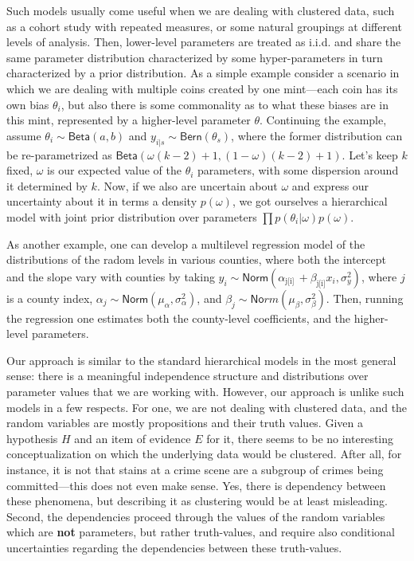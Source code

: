 \documentclass[
  10pt,
  dvipsnames,enabledeprecatedfontcommands]{scrartcl}
\begin{document}
Such models usually come useful when we are dealing with clustered data,
such as a cohort study with repeated measures, or some natural groupings
at different levels of analysis. Then, lower-level parameters are
treated as i.i.d. and share the same parameter distribution
characterized by some hyper-parameters in turn characterized by a prior
distribution. As a simple example consider a scenario in which we are
dealing with multiple coins created by one mint---each coin has its own
bias \(\theta_i\), but also there is some commonality as to what these
biases are in this mint, represented by a higher-level parameter
\(\theta\). Continuing the example, assume
\(\theta_i \sim \mathsf{Beta}(a, b)\) and
\(y_{i\vert s} \sim \mathsf{Bern}(\theta_s)\), where the former
distribution can be re-parametrized as
\(\mathsf{Beta}(\omega(k-2)+1, (1-\omega)(k-2)+1)\). Let's keep \(k\)
fixed, \(\omega\) is our expected value of the \(\theta_i\) parameters,
with some dispersion around it determined by \(k\). Now, if we also are
uncertain about \(\omega\) and express our uncertainty about it in terms
a density \(p(\omega)\), we got ourselves a hierarchical model with
joint prior distribution over parameters
\(\prod p(\theta_i \vert \omega) p(\omega)\).

As another example, one can develop a multilevel regression model of the
distributions of the radom levels in various counties, where both the
intercept and the slope vary with counties by taking
\(y_i\sim \mathsf{Norm}(\alpha_{\mbox{j[i]}}\, + \beta_{\mbox{j[i]}} x_i, \sigma^2_y )\),
where \(j\) is a county index,
\(\alpha_j \sim \mathsf{Norm}(\mu_\alpha,\sigma_\alpha^2 )\), and
\(\beta_j \sim \mathsf{No}rm(\mu_\beta,\sigma_\beta^2 )\). Then, running
the regression one estimates both the county-level coefficients, and the
higher-level parameters.

Our approach is similar to the standard hierarchical models in the most
general sense: there is a meaningful independence structure and
distributions over parameter values that we are working with. However,
our approach is unlike such models in a few respects. For one, we are
not dealing with clustered data, and the random variables are mostly
propositions and their truth values. Given a hypothesis \(H\) and an
item of evidence \(E\) for it, there seems to be no interesting
conceptualization on which the underlying data would be clustered. After
all, for instance, it is not that stains at a crime scene are a subgroup
of crimes being committed---this does not even make sense. Yes, there is
dependency between these phenomena, but describing it as clustering
would be at least misleading. Second, the dependencies proceed through
the values of the random variables which are \textbf{not} parameters,
but rather truth-values, and require also conditional uncertainties
regarding the dependencies between these truth-values.
\end{document}
